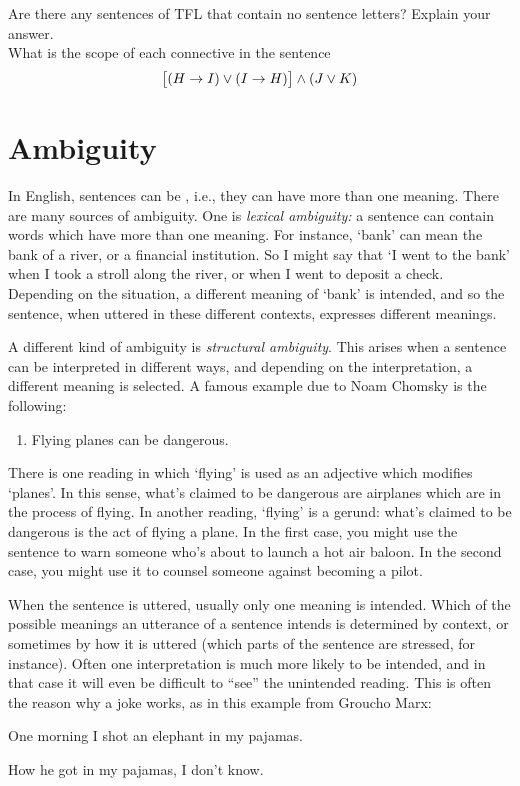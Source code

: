 \problempart
Are there any sentences of TFL that contain no sentence letters? Explain your answer.\\

\problempart
What is the scope of each connective in the sentence
$$\bigl[(H \rightarrow I) \vee (I \rightarrow H)\bigr] \wedge (J \vee K)$$

\chapter{Ambiguity}\label{s:AmbiguityTFL}

In English, sentences can be , i.e., they can have more than one meaning.  There are many sources of ambiguity. One is \emph{lexical ambiguity:} a sentence can contain words which have more than one meaning.  For instance, `bank' can mean the bank of a river, or a financial institution. So I might say that `I went to the bank' when I took a stroll along the river, or when I went to deposit a check.  Depending on the situation, a different meaning of `bank' is intended, and so the sentence, when uttered in these different contexts, expresses different meanings.

A different kind of ambiguity is \emph{structural ambiguity}.  This arises when a sentence can be interpreted in different ways, and depending on the interpretation, a different meaning is selected.  A famous example due to Noam Chomsky is the following:
\begin{enumerate}
	\item[] Flying planes can be dangerous.
\end{enumerate}
There is one reading in which `flying' is used as an adjective which modifies `planes'. In this sense, what's claimed to be dangerous are airplanes which are in the process of flying.  In another reading, `flying' is a gerund: what's claimed to be dangerous is the act of flying a plane.  In the first case, you might use the sentence to warn someone who's about to launch a hot air baloon.  In the second case, you might use it to counsel someone against becoming a pilot.

When the sentence is uttered, usually only one meaning is intended. Which of the possible meanings an utterance of a sentence intends is determined by context, or sometimes by how it is uttered (which parts of the sentence are stressed, for instance). Often one interpretation is much more likely to be intended, and in that case it will even be difficult to ``see'' the unintended reading.  This is often the reason why a joke works, as in this example from Groucho Marx:
\begin{compactlist}
	\item[] One morning I shot an elephant in my pajamas.
	\item[] How he got in my pajamas, I don't know.
\end{compactlist}

